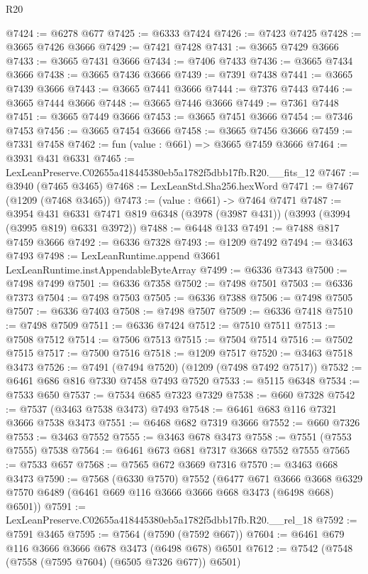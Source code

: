 \begin{lexlean}{R20}
\begin{coremodule}
@7424 := @6278 @677
@7425 := @6333 @7424
@7426 := @7423 @7425
@7428 := @3665 @7426 @3666
@7429 := @7421 @7428
@7431 := @3665 @7429 @3666
@7433 := @3665 @7431 @3666
@7434 := @7406 @7433
@7436 := @3665 @7434 @3666
@7438 := @3665 @7436 @3666
@7439 := @7391 @7438
@7441 := @3665 @7439 @3666
@7443 := @3665 @7441 @3666
@7444 := @7376 @7443
@7446 := @3665 @7444 @3666
@7448 := @3665 @7446 @3666
@7449 := @7361 @7448
@7451 := @3665 @7449 @3666
@7453 := @3665 @7451 @3666
@7454 := @7346 @7453
@7456 := @3665 @7454 @3666
@7458 := @3665 @7456 @3666
@7459 := @7331 @7458
@7462 := fun (value : @661) => @3665 @7459 @3666
@7464 := @3931 @431 @6331
@7465 := LexLeanPreserve.C02655a418445380eb5a1782f5dbb17fb.R20.__fits_12
@7467 := @3940 (@7465 @3465)
@7468 := LexLeanStd.Sha256.hexWord
@7471 := @7467 (@1209 (@7468 @3465))
@7473 := (value : @661) -> @7464 @7471
@7487 := @3954
    @431
    @6331
    @7471
    @819
    @6348
    (@3978 (@3987 @431))
    (@3993 (@3994 (@3995 @819) @6331 @3972))
@7488 := @6448 @133
@7491 := @7488 @817 @7459 @3666
@7492 := @6336 @7328
@7493 := @1209 @7492
@7494 := @3463 @7493
@7498 := LexLeanRuntime.append @3661 LexLeanRuntime.instAppendableByteArray
@7499 := @6336 @7343
@7500 := @7498 @7499
@7501 := @6336 @7358
@7502 := @7498 @7501
@7503 := @6336 @7373
@7504 := @7498 @7503
@7505 := @6336 @7388
@7506 := @7498 @7505
@7507 := @6336 @7403
@7508 := @7498 @7507
@7509 := @6336 @7418
@7510 := @7498 @7509
@7511 := @6336 @7424
@7512 := @7510 @7511
@7513 := @7508 @7512
@7514 := @7506 @7513
@7515 := @7504 @7514
@7516 := @7502 @7515
@7517 := @7500 @7516
@7518 := @1209 @7517
@7520 := @3463 @7518 @3473
@7526 := @7491 (@7494 @7520) (@1209 (@7498 @7492 @7517))
@7532 := @6461 @686 @816 @7330 @7458 @7493 @7520
@7533 := @5115 @6348
@7534 := @7533 @650
@7537 := @7534 @685 @7323 @7329
@7538 := @660 @7328
@7542 := @7537 (@3463 @7538 @3473) @7493
@7548 := @6461 @683 @116 @7321 @3666 @7538 @3473
@7551 := @6468 @682 @7319 @3666
@7552 := @660 @7326
@7553 := @3463 @7552
@7555 := @3463 @678 @3473
@7558 := @7551 (@7553 @7555) @7538
@7564 := @6461 @673 @681 @7317 @3668 @7552 @7555
@7565 := @7533 @657
@7568 := @7565 @672 @3669 @7316
@7570 := @3463 @668 @3473
@7590 := @7568
    (@6330 @7570)
    @7552
    (@6477
      @671
      @3666
      @3668
      @6329
      @7570
      @6489
      (@6461 @669 @116 @3666 @3666 @668 @3473 (@6498 @668) @6501))
@7591 := LexLeanPreserve.C02655a418445380eb5a1782f5dbb17fb.R20.__rel_18
@7592 := @7591 @3465
@7595 := @7564 (@7590 (@7592 @667))
@7604 := @6461 @679 @116 @3666 @3666 @678 @3473 (@6498 @678) @6501
@7612 := @7542 (@7548 (@7558 (@7595 @7604) (@6505 @7326 @677)) @6501)

\end{coremodule}
\end{lexlean}
